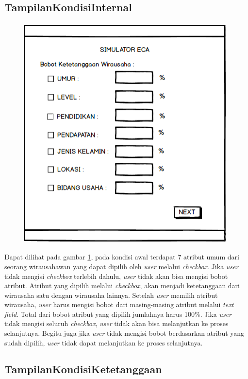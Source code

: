 \subsection{TampilanKondisiInternal}

\begin{figure} [H]
	\centering  
	\includegraphics[width=11cm, height=12cm]{mockup1} 
	\label{fig:kondisiInternal} 
\end{figure}

Dapat dilihat pada gambar \ref{fig:kondisiInternal}, pada kondisi awal terdapat 7 atribut umum dari seorang wirausahawan yang dapat dipilih oleh \textit{user} melalui \textit{checkbox}. Jika \textit{user} tidak mengisi \textit{checkbox} terlebih dahulu, \textit{user} tidak akan bisa mengisi bobot atribut. Atribut yang dipilih melalui \textit{checkbox}, akan menjadi ketetanggaan dari wirausaha satu dengan wirausaha lainnya. Setelah \textit{user} memilih atribut wirausaha, \textit{user} harus mengisi bobot dari masing-masing atribut melalui \textit{text field}. Total dari bobot atribut yang dipilih jumlahnya harus 100\%. Jika \textit{user} tidak mengisi seluruh  \textit{checkbox}, \textit{user} tidak akan bisa melanjutkan ke proses selanjutnya. Begitu juga jika \textit{user} tidak mengisi bobot berdasarkan atribut yang sudah dipilih, \textit{user} tidak dapat melanjutkan ke proses selanjutnya.

\subsection{TampilanKondisiKetetanggaan}

